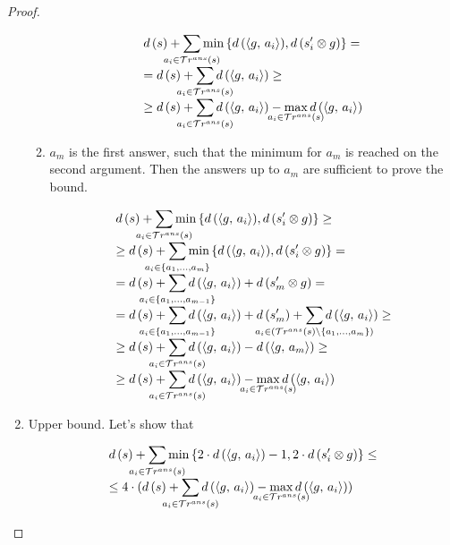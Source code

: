 \begin{proof}
\begin{enumerate}
\begin{enumerate}
    \[ \begin{array}{l}
        d\,(s) + \smashoperator[lr]{\sum\limits_{a_i \in \tra{s}}} \min\,\{ d\,(\taskst{g}{a_i}), d\,(s'_i \otimes g)\} = \\
        = d\,(s) + \smashoperator[lr]{\sum\limits_{a_i \in \tra{s}}} d\,(\taskst{g}{a_i}) \ge \\
        \ge d\,(s) + \smashoperator[lr]{\sum\limits_{a_i \in \tra{s}}} d\,(\taskst{g}{a_i}) - \smashoperator{\max\limits_{a_i \in \tra{s}}} d\,(\taskst{g}{a_i}) \\
  \end{array} \]
  
    \item $a_m$ is the first answer, such that the minimum for $a_m$ is reached on the second argument. Then the answers up to $a_m$ are sufficient to prove the bound. 
    
    \[ \begin{array}{l}
        d\,(s) + \smashoperator[lr]{\sum\limits_{a_i \in \tra{s}}} \min\,\{ d\,(\taskst{g}{a_i}), d\,(s'_i \otimes g)\} \ge \\
        \ge d\,(s) + \smashoperator[lr]{\sum\limits_{a_i \in \{ a_1, \dots, a_m \}}} \min\,\{ d\,(\taskst{g}{a_i}), d\,(s'_i \otimes g)\} = \\
        = d\,(s) + \smashoperator[lr]{\sum\limits_{a_i \in \{ a_1, \dots, a_{m - 1} \}}} d\,(\taskst{g}{a_i}) + d\,(s'_m \otimes g) = \\
        = d\,(s) + \smashoperator[lr]{\sum\limits_{a_i \in \{ a_1, \dots, a_{m - 1} \}}} d\,(\taskst{g}{a_i}) + d\,(s'_m) + \smashoperator[lr]{\sum\limits_{a_i \in (\tra{s} \setminus \{ a_{1}, \dots, a_{m} \})}} d\,(\taskst{g}{a_i})  \ge \\
        \ge d\,(s) + \smashoperator[lr]{\sum\limits_{a_i \in \tra{s}}} d\,(\taskst{g}{a_i}) -  d\,(\taskst{g}{a_m}) \ge \\
        \ge d\,(s) + \smashoperator[lr]{\sum\limits_{a_i \in \tra{s}}} d\,(\taskst{g}{a_i}) -  \smashoperator{\max\limits_{a_i \in \tra{s}}} d\,(\taskst{g}{a_i}) \\
  \end{array} \]
  \end{enumerate}

  \item 
  Upper bound. Let's show that 
  
  \[ \begin{array}{l}
  d\,(s) + \smashoperator[lr]{\sum\limits_{a_i \in \tra{s}}} \min\,\{2\cdot d\,(\taskst{g}{a_i}) - 1, 2\cdot d\,(s'_i \otimes g)\}  \le \\
  \le 4 \cdot (d\,(s) + \smashoperator[lr]{\sum\limits_{a_i \in \tra{s}}} d\,(\taskst{g}{a_i}) - \smashoperator{\max\limits_{a_i \in \tra{s}}} d\,(\taskst{g}{a_i})) \\
  \end{array} \]
  

\end{enumerate}
\end{proof}

